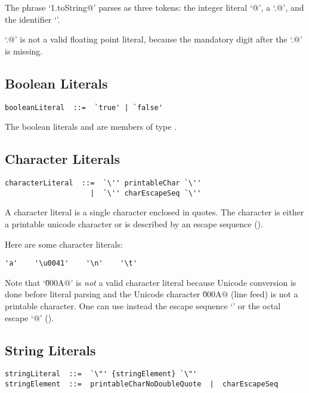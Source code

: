 \example
The phrase `\lstinline@1.toString@' parses as three tokens:
the integer literal `@', a `\lstinline@.@', and the identifier `\lstinline@toString@'.

\example
`.@' is not a valid floating point literal, because the 
mandatory digit after the `\lstinline@.@' is missing. 



\subsection{Boolean Literals}

\syntax\begin{lstlisting}
booleanLiteral  ::=  `true' | `false'
\end{lstlisting}

The boolean literals \lstinline@true@ and \lstinline@false@ are
members of type \lstinline@Boolean@.

\subsection{Character Literals}

\syntax\begin{lstlisting}
characterLiteral  ::=  `\'' printableChar `\''
                    |  `\'' charEscapeSeq `\''
\end{lstlisting}

A character literal is a single character enclosed in quotes.
The character is either a printable unicode character or is described
by an escape sequence ().

\example
Here are some character literals:
\begin{lstlisting}
'a'    '\u0041'    '\n'    '\t'
\end{lstlisting}
Note that `\lstinline@\u000A@' is {\em not} a valid character literal because
Unicode conversion is done before literal parsing and the Unicode
character \lstinline@\u000A@ (line feed) is not a printable
character. One can use instead the escape sequence `\lstinline@\n@' or
the octal escape `\lstinline@{}@' ().

\subsection{String Literals}\label{sec:string-literals}

\syntax\begin{lstlisting}
stringLiteral  ::=  `\"' {stringElement} `\"'
stringElement  ::=  printableCharNoDoubleQuote  |  charEscapeSeq
\end{lstlisting}

